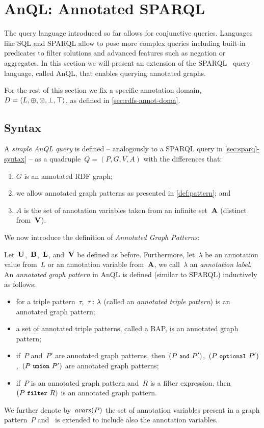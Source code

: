 \section{AnQL: Annotated SPARQL}
\label{sec:annotated-sparql}

The query language introduced so far allows for conjunctive queries.  Languages like \ac{SQL} and SPARQL allow to pose
more complex queries including built-in predicates to filter solutions and advanced features such as negation or
aggregates.
%
In this section we will present an extension of the SPARQL~\cite{PrudhommeauxSeaborne:2008aa} query language, called
AnQL, that enables querying annotated graphs.

For the rest of this section we fix a specific annotation domain,~$D = \langle L, \oplus, \otimes, \bot, \top \rangle$, as
defined in \cref{sec:rdfs-annot-doma}.

\subsection{Syntax}
\label{sec:aSPARQL-syntax}

A \emph{simple AnQL query} is defined -- analogously to a SPARQL query in \cref{sec:sparql-syntax} -- as a
quadruple~$Q=(P,G,V, A)$ with the differences that:
%
\begin{enumerate}[(1),noitemsep]
\item $G$ is an annotated \ac{RDF} graph;
\item we allow annotated graph patterns as presented in \cref{def:pattern}; and
\item $A$ is the set of annotation variables taken from an infinite set~$\mathbf{A}$ (distinct from~$\mathbf{V}$).
\end{enumerate}
%
We now introduce the definition of \emph{Annotated Graph Patterns}:
%
\begin{definition}
  \label{def:pattern}
  Let~$\mathbf{U}$,~$\mathbf{B}$,~$\mathbf{L}$, and~$\mathbf{V}$ be defined as before. Furthermore, let~$\lambda$ be an annotation value from~$L$ or
  an annotation variable from~$\mathbf{A}$, we call~$\lambda$ an \emph{annotation label}.
  An \emph{annotated graph pattern} in AnQL is defined (similar to SPARQL) inductively as follows:
  \begin{itemize}[noitemsep]
  \item for a triple pattern~$\tau$,~$\mbox{$\tau\colon\lambda$}$ (called an \emph{annotated triple pattern}) is an
    annotated graph pattern;
  \item a set of annotated triple patterns, called a \acf{BAP}, is an annotated graph pattern;
  \item if~$P$ and~$P'$ are annotated graph patterns, then~$(P\ \AND\ P')$,~$(P\ \OPTIONAL\ P')$,~$(P\ \texttt{{\small union}}\ P')$ are
    annotated graph patterns;
  \item if~$P$ is an annotated graph pattern and~$R$ is a filter expression, then~$(P\ \FILTER\ R)$ is an annotated
    graph pattern.
  \end{itemize}
  We further denote by~$\mathit{avars}\!\left(P\right)$ the set of annotation variables present in a graph pattern~$P$ and~
  is extended to include also the annotation variables.
\end{definition}

